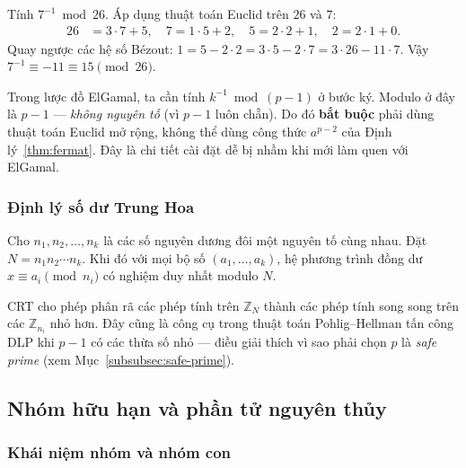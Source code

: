 \documentclass[../DoAn.tex]{subfiles}
\begin{document}
\begin{example}
\label{ex:extgcd}
Tính $7^{-1} \bmod 26$. Áp dụng thuật toán Euclid trên $26$ và $7$:
\begin{align*}
26 &= 3 \cdot 7 + 5, \quad
7  = 1 \cdot 5 + 2, \quad
5  = 2 \cdot 2 + 1, \quad
2  = 2 \cdot 1 + 0.
\end{align*}
Quay ngược các hệ số Bézout: $1 = 5 - 2\cdot 2 = 3\cdot 5 - 2\cdot 7 = 3\cdot 26 - 11\cdot 7$.
Vậy $7^{-1} \equiv -11 \equiv 15 \pmod{26}$.
\end{example}

\begin{remark}
\label{rmk:euclid-elgamal}
Trong lược đồ ElGamal, ta cần tính $k^{-1} \bmod (p-1)$ ở bước ký. Modulo ở đây là $p-1$ --- \emph{không nguyên tố} (vì $p-1$ luôn chẵn). Do đó \textbf{bắt buộc} phải dùng thuật toán Euclid mở rộng, không thể dùng công thức $a^{p-2}$ của Định lý~\ref{thm:fermat}. Đây là chi tiết cài đặt dễ bị nhầm khi mới làm quen với ElGamal.
\end{remark}

\subsubsection{Định lý số dư Trung Hoa}

\begin{theorem}
Cho $n_1, n_2, \ldots, n_k$ là các số nguyên dương đôi một nguyên tố cùng nhau. Đặt $N = n_1 n_2 \cdots n_k$. Khi đó với mọi bộ số $(a_1, \ldots, a_k)$, hệ phương trình đồng dư $x \equiv a_i \pmod{n_i}$ có nghiệm duy nhất modulo $N$.
\end{theorem}

CRT cho phép phân rã các phép tính trên $\mathbb{Z}_N$ thành các phép tính song song trên các $\mathbb{Z}_{n_i}$ nhỏ hơn. Đây cũng là công cụ trong thuật toán Pohlig--Hellman tấn công DLP khi $p-1$ có các thừa số nhỏ --- điều giải thích vì sao phải chọn $p$ là \emph{safe prime} (xem Mục~\ref{subsubsec:safe-prime}).

\subsection{Nhóm hữu hạn và phần tử nguyên thủy}
\label{subsec:groups}

\subsubsection{Khái niệm nhóm và nhóm con}
\end{document}
